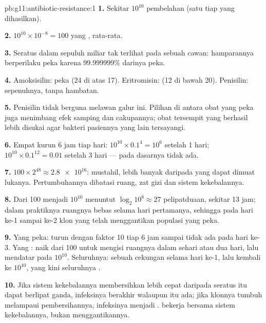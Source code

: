 \begin{solution}{pb:g11:antibiotic-resistance:1}
\textbf{1.} Sekitar $10^{10}$ pembelahan (satu tiap  yang dihasilkan).

\textbf{2.} $10^{10} \times 10^{-8} = 100$  yang , rata-rata.

\textbf{3.} Seratus  dalam sepuluh miliar tak terlihat pada sebuah
cawan: hamparannya berperilaku peka karena 99.999999\% darinya peka.

\textbf{4.} Amoksisilin: peka (24 di atas 17). Eritromisin:  (12
di bawah 20). Penisilin:  sepenuhnya, tanpa hambatan.

\textbf{5.} Penisilin tidak berguna melawan galur ini. Pilihan di
antara obat yang peka juga menimbang efek samping dan cakupannya; obat
tersempit yang berhasil lebih disukai agar bakteri pasiennya yang lain
tersayangi.

\textbf{6.} Empat kurun 6 jam tiap hari: $10^{10} \times 0.1^4 =
10^6$ setelah 1 hari; $10^{10} \times 0.1^{12} = 0.01$ setelah 3 hari
--- pada dasarnya tidak ada.

\textbf{7.} $100 \times 2^{48} \approx \num{2.8e16}$: mustahil, lebih
banyak daripada yang dapat dimuat lukanya. Pertumbuhannya dibatasi
ruang, zat gizi dan sistem kekebalannya.

\textbf{8.} Dari 100  menjadi $10^{10}$ menuntut $\log_2 10^8 \approx 27$
pelipatduaan, sekitar 13 jam; dalam praktiknya ruangnya bebas selama
hari pertamanya, sehingga pada hari ke-1 sampai ke-2 klon yang 
telah menggantikan populasi yang peka.

\textbf{9.} Yang peka: turun dengan faktor 10 tiap 6 jam sampai tidak
ada pada hari ke-3. Yang : naik dari 100 untuk mengisi ruangnya
dalam sehari atau dua hari, lalu mendatar pada $10^{10}$. Seluruhnya:
sebuah cekungan selama hari ke-1, lalu kembali ke $10^{10}$, yang kini
seluruhnya .

\textbf{10.} Jika sistem kekebalannya membersihkan  lebih cepat
daripada seratus   itu dapat berlipat ganda, infeksinya
berakhir walaupun  itu ada; jika klonnya tumbuh melampaui
pembersihannya, infeksinya menjadi .  bekerja bersama
sistem kekebalannya, bukan menggantikannya.


\end{solution}
